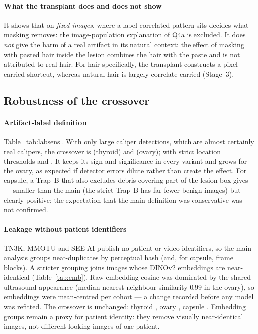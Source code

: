 \paragraph{What the transplant does and does not show} It shows that on \emph{fixed images}, where a label-correlated
pattern sits decides what masking removes: the image-population explanation of Q4a is excluded. It does \emph{not} give
the harm of a real artifact in its natural context: the effect of masking with pasted hair inside the lesion combines the
hair with the paste and is not attributed to real hair. For hair specifically, the transplant constructs a
pixel-carried shortcut, whereas natural hair is largely correlate-carried (Stage~3).


\subsection{Robustness of the crossover}
\paragraph{Artifact-label definition} Table~\ref{tab:labsens}. With only large caliper detections, which are almost
certainly real calipers, the crossover is \sFourSensdinoFiveOneEightsenspxFiveZeroThyroid{} (thyroid) and
\sFourSensdinoFiveOneEightsenspxFiveZeroOvary{} (ovary); with strict location thresholds
\sFourSensdinoFiveOneEightsensstrictlocThyroid{} and \sFourSensdinoFiveOneEightsensstrictlocOvary. It keeps its sign and
significance in every variant and grows for the ovary, as expected if detector errors dilute rather than create the
effect. For capsule, a Trap~B that also excludes debris covering part of the lesion box gives
\sFourSensdinoFiveOneEightsensstrictBCapsule{} --- smaller than the main \sFourXCap{} (the strict Trap~B has far fewer
benign images) but clearly positive; the expectation that the main definition was conservative was not confirmed.

\paragraph{Leakage without patient identifiers} TN3K, MMOTU and SEE-AI publish no patient or video identifiers, so the
main analysis groups near-duplicates by perceptual hash (and, for capsule, frame blocks). A stricter grouping joins images
whose DINOv2 embeddings are near-identical (Table~\ref{tab:emb}). Raw embedding cosine was dominated by the shared
ultrasound appearance (median nearest-neighbour similarity 0.99 in the ovary), so embeddings were mean-centred per cohort
--- a change recorded before any model was refitted. The crossover is unchanged: thyroid \sFourEmbThyroid, ovary
\sFourEmbOvary, capsule \sFourEmbCapsule. Embedding groups remain a proxy for patient identity: they remove visually
near-identical images, not different-looking images of one patient.

